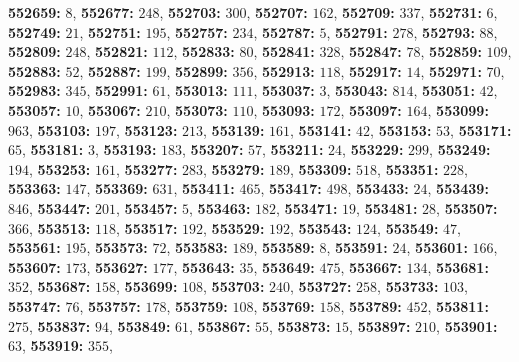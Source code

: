 \textsf{\bfseries 552659:} $8$, \textsf{\bfseries 552677:} $248$, \textsf{\bfseries 552703:} $300$, \textsf{\bfseries 552707:} $162$, \textsf{\bfseries 552709:} $337$, \textsf{\bfseries 552731:} $6$, \textsf{\bfseries 552749:} $21$, \textsf{\bfseries 552751:} $195$, \textsf{\bfseries 552757:} $234$, \textsf{\bfseries 552787:} $5$, \textsf{\bfseries 552791:} $278$, \textsf{\bfseries 552793:} $88$, \textsf{\bfseries 552809:} $248$, \textsf{\bfseries 552821:} $112$, \textsf{\bfseries 552833:} $80$, \textsf{\bfseries 552841:} $328$, \textsf{\bfseries 552847:} $78$, \textsf{\bfseries 552859:} $109$, \textsf{\bfseries 552883:} $52$, \textsf{\bfseries 552887:} $199$, \textsf{\bfseries 552899:} $356$, \textsf{\bfseries 552913:} $118$, \textsf{\bfseries 552917:} $14$, \textsf{\bfseries 552971:} $70$, \textsf{\bfseries 552983:} $345$, \textsf{\bfseries 552991:} $61$, \textsf{\bfseries 553013:} $111$, \textsf{\bfseries 553037:} $3$, \textsf{\bfseries 553043:} $814$, \textsf{\bfseries 553051:} $42$, \textsf{\bfseries 553057:} $10$, \textsf{\bfseries 553067:} $210$, \textsf{\bfseries 553073:} $110$, \textsf{\bfseries 553093:} $172$, \textsf{\bfseries 553097:} $164$, \textsf{\bfseries 553099:} $963$, \textsf{\bfseries 553103:} $197$, \textsf{\bfseries 553123:} $213$, \textsf{\bfseries 553139:} $161$, \textsf{\bfseries 553141:} $42$, \textsf{\bfseries 553153:} $53$, \textsf{\bfseries 553171:} $65$, \textsf{\bfseries 553181:} $3$, \textsf{\bfseries 553193:} $183$, \textsf{\bfseries 553207:} $57$, \textsf{\bfseries 553211:} $24$, \textsf{\bfseries 553229:} $299$, \textsf{\bfseries 553249:} $194$, \textsf{\bfseries 553253:} $161$, \textsf{\bfseries 553277:} $283$, \textsf{\bfseries 553279:} $189$, \textsf{\bfseries 553309:} $518$, \textsf{\bfseries 553351:} $228$, \textsf{\bfseries 553363:} $147$, \textsf{\bfseries 553369:} $631$, \textsf{\bfseries 553411:} $465$, \textsf{\bfseries 553417:} $498$, \textsf{\bfseries 553433:} $24$, \textsf{\bfseries 553439:} $846$, \textsf{\bfseries 553447:} $201$, \textsf{\bfseries 553457:} $5$, \textsf{\bfseries 553463:} $182$, \textsf{\bfseries 553471:} $19$, \textsf{\bfseries 553481:} $28$, \textsf{\bfseries 553507:} $366$, \textsf{\bfseries 553513:} $118$, \textsf{\bfseries 553517:} $192$, \textsf{\bfseries 553529:} $192$, \textsf{\bfseries 553543:} $124$, \textsf{\bfseries 553549:} $47$, \textsf{\bfseries 553561:} $195$, \textsf{\bfseries 553573:} $72$, \textsf{\bfseries 553583:} $189$, \textsf{\bfseries 553589:} $8$, \textsf{\bfseries 553591:} $24$, \textsf{\bfseries 553601:} $166$, \textsf{\bfseries 553607:} $173$, \textsf{\bfseries 553627:} $177$, \textsf{\bfseries 553643:} $35$, \textsf{\bfseries 553649:} $475$, \textsf{\bfseries 553667:} $134$, \textsf{\bfseries 553681:} $352$, \textsf{\bfseries 553687:} $158$, \textsf{\bfseries 553699:} $108$, \textsf{\bfseries 553703:} $240$, \textsf{\bfseries 553727:} $258$, \textsf{\bfseries 553733:} $103$, \textsf{\bfseries 553747:} $76$, \textsf{\bfseries 553757:} $178$, \textsf{\bfseries 553759:} $108$, \textsf{\bfseries 553769:} $158$, \textsf{\bfseries 553789:} $452$, \textsf{\bfseries 553811:} $275$, \textsf{\bfseries 553837:} $94$, \textsf{\bfseries 553849:} $61$, \textsf{\bfseries 553867:} $55$, \textsf{\bfseries 553873:} $15$, \textsf{\bfseries 553897:} $210$, \textsf{\bfseries 553901:} $63$, \textsf{\bfseries 553919:} $355$, 
